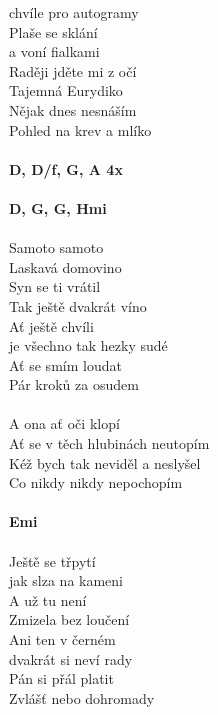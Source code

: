 \begin{multicols}{2}
chvíle pro autogramy\\
Plaše se sklání\\
a voní fialkami\\
Raději jděte mi z očí\\
Tajemná Eurydiko\\
Nějak dnes nesnáším\\
Pohled na krev a mlíko\\
\\
\footnotesize\textbf{D, D/f\kr , G, A 4x}\\
\\
\textbf{D, G, G, Hmi}\\
\normalsize
\\
Samoto samoto\\
Laskavá domovino\\
Syn se ti vrátil\\
Tak ještě dvakrát víno\\
Ať ještě chvíli\\
je všechno tak hezky sudé\\
Ať se smím loudat\\
Pár kroků za osudem\\
\\
A ona ať oči klopí\\
Ať se v těch hlubinách neutopím\\
Kéž bych tak neviděl a neslyšel\\
Co nikdy nikdy nepochopím\\
\\
\footnotesize\textbf{Emi}\\
\normalsize
\\
Ještě se třpytí\\
jak slza na kameni\\
A už tu není\\
Zmizela bez loučení\\
Ani ten v černém\\
dvakrát si neví rady\\
Pán si přál platit\\
Zvlášť nebo dohromady\\
\end{multicols}